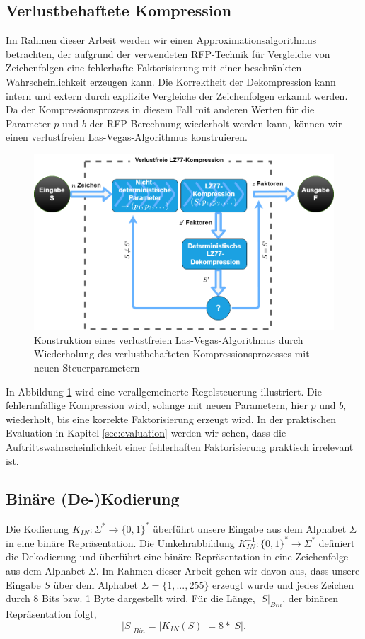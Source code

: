 \subsection{Verlustbehaftete Kompression}
Im Rahmen dieser Arbeit werden wir einen Approximationsalgorithmus betrachten, der aufgrund der verwendeten RFP-Technik für Vergleiche von Zeichenfolgen eine fehlerhafte Faktorisierung mit 
einer beschränkten Wahrscheinlichkeit erzeugen kann. Die Korrektheit der Dekompression kann intern und extern durch explizite Vergleiche der Zeichenfolgen erkannt werden. Da der
Kompressionsprozess in diesem Fall mit anderen Werten für die Parameter $p$ und $b$ der RFP-Berechnung wiederholt werden kann, können wir einen verlustfreien Las-Vegas-Algorithmus konstruieren.

\begin{figure} [ht]
    \centering
    \caption{Konstruktion eines verlustfreien Las-Vegas-Algorithmus durch Wiederholung des verlustbehafteten Kompressionsprozesses mit neuen Steuerparametern}
    \label{fig:lasvegas}
    \includegraphics[scale=0.4]{Images/lasvegas_algorithm.png}
\end{figure}

In Abbildung \ref{fig:lasvegas} wird eine verallgemeinerte Regelsteuerung illustriert. Die fehleranfällige Kompression wird, solange mit neuen Parametern, hier $p$ und $b$, wiederholt, bis
eine korrekte Faktorisierung erzeugt wird. In der praktischen Evaluation in Kapitel \ref{sec:evaluation} werden wir sehen, dass die Auftrittswahrscheinlichkeit einer fehlerhaften Faktorisierung
praktisch irrelevant ist.

\subsection{Binäre (De-)Kodierung}
Die Kodierung $K_{IN}: \Sigma^* \rightarrow \{0,1\}^*$ überführt unsere Eingabe aus dem Alphabet $\Sigma$ in eine binäre Repräsentation.
Die Umkehrabbildung $K^{-1}_{IN}: \{0,1\}^* \rightarrow \Sigma^*$ definiert die Dekodierung und überführt eine binäre Repräsentation in eine Zeichenfolge
aus dem Alphabet $\Sigma$. Im Rahmen dieser Arbeit gehen wir davon aus, dass unsere Eingabe $S$ über dem Alphabet $\Sigma=\{1,...,255\}$ erzeugt wurde und 
jedes Zeichen durch 8 Bits bzw. 1 Byte dargestellt wird. Für die Länge, $|S|_{Bin}$, der binären Repräsentation folgt,
\begin{equation} \label{eq:bin}
    |S|_{Bin} = |K_{IN}(S)| = 8*|S|.
\end{equation}

